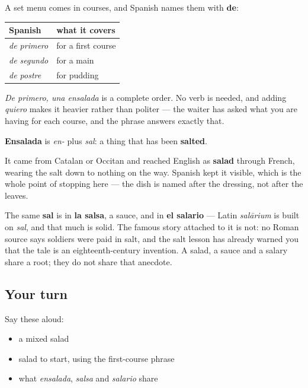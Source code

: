 \begin{grammarlens}[title={Grammar Lens: ordering a course}]
A set menu comes in courses, and Spanish names them with \textbf{de}:

\noindent
\begin{tabularx}{\linewidth}{@{}>{\raggedright\arraybackslash}X>{\raggedright\arraybackslash}X@{}}
\toprule
\textbf{Spanish} & \textbf{what it covers} \\
\midrule
\emph{de primero} & for a first course \\
\emph{de segundo} & for a main \\
\emph{de postre} & for pudding \\
\bottomrule
\end{tabularx}

\emph{De primero, una ensalada} is a complete order. No verb is needed, and adding \emph{quiero} makes it heavier rather than politer — the waiter has asked what you are having for each course, and the phrase answers exactly that.
\end{grammarlens}

\begin{cousinweb}
\textbf{Ensalada} is \emph{en-} plus \emph{sal}: a thing that has been \textbf{salted}.

It came from Catalan or Occitan and reached English as \textbf{salad} through French, wearing the salt down to nothing on the way. Spanish kept it visible, which is the whole point of stopping here — the dish is named after the dressing, not after the leaves.

The same \textbf{sal} is in \textbf{la salsa}, a sauce, and in \textbf{el salario} — Latin \emph{salārium} is built on \emph{sal}, and that much is solid. The famous story attached to it is not: no Roman source says soldiers were paid in salt, and the salt lesson has already warned you that the tale is an eighteenth-century invention. A salad, a sauce and a salary share a root; they do not share that anecdote.
\end{cousinweb}

\subsection*{Your turn}
Say these aloud:

\begin{itemize}
\raggedright
  \item a mixed salad
  \item salad to start, using the first-course phrase
  \item what \emph{ensalada}, \emph{salsa} and \emph{salario} share
\end{itemize}

